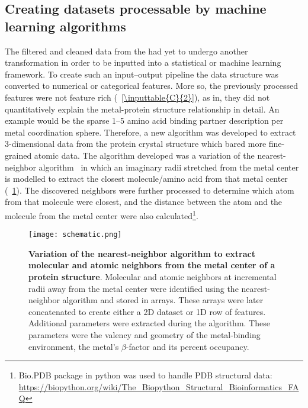 \documentclass[../main/main]{subfiles}
\begin{document}
\subsection{Creating datasets processable by machine learning algorithms}
The filtered and cleaned data from the \mPDB{} had yet to undergo another transformation in order to be inputted into a statistical or machine learning framework. To create such an input--output pipeline the data structure was converted to numerical or categorical features. More so, the previously processed features were not feature rich (\TABLE~\ref{\inputtable{C}{2}}), as in, they did not quantitatively explain the metal-protein structure relationship in detail. An example would be the sparse 1--5 amino acid binding partner description per metal coordination sphere. Therefore, a new algorithm was developed to extract 3-dimensional data from the protein crystal structure which bared more fine-grained atomic data. The algorithm developed was a variation of the nearest-neighbor algorithm~\cite{arya1998optimal} in which an imaginary radii stretched from the metal center is modelled to extract the closest molecule/amino acid from that metal center (\FIGURE~\ref{\figname{C}{3}}). The discovered neighbors were further processed to determine which atom from that molecule were closest, and the distance between the atom and the molecule from the metal center were also calculated\footnote{
	Bio.PDB package in python was used to handle PDB structural data: \url{https://biopython.org/wiki/The_Biopython_Structural_Bioinformatics_FAQ}
}.

\begin{figure}[H]
	\centering
	\texttt{[image: schematic.png]}
	\caption[Variation of the nearest-neighbor algorithm to extract molecular and atomic neighbors from the metal center of a protein structure]
	{
		\textbf{Variation of the nearest-neighbor algorithm to extract molecular and atomic neighbors from the metal center of a protein structure}.
		Molecular and atomic neighbors at incremental radii away from the metal center were identified using the nearest-neighbor algorithm and stored in arrays. These arrays were later concatenated to create either a 2D dataset or 1D row of features. Additional parameters were extracted during the algorithm. These parameters were the valency and geometry of the metal-binding environment, the metal's $\beta$-factor and its percent occupancy.
	}
	\label{\figname{C}{3}}
\end{figure}
\end{document}
